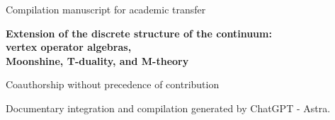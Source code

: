 \thispagestyle{plain}
\begin{center}
{\fontsize{10}{12}\selectfont Compilation manuscript for academic transfer\par}
\vspace{6mm}
{\fontsize{17}{20.5}\selectfont\bfseries
Extension of the discrete structure of the continuum:\\
vertex operator algebras,\\
Moonshine, T-duality, and M-theory\par}
\vspace{11pt}
{\fontsize{11.5}{14}\selectfont\Autores\par}
\vspace{4pt}
{\fontsize{8}{10}\selectfont Coauthorship without precedence of contribution\par}
\vspace{3pt}
{\fontsize{8}{10}\selectfont Documentary integration and compilation generated by ChatGPT - Astra.\par}
\end{center}
\vspace{7pt}
